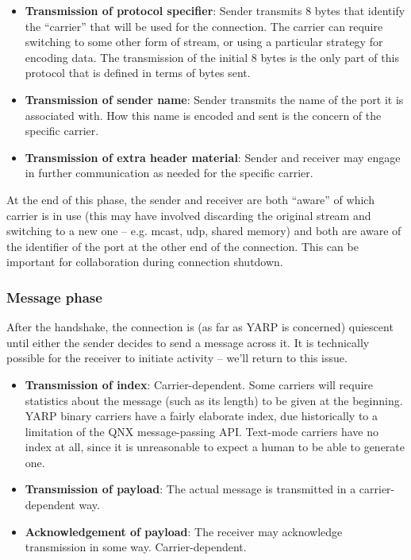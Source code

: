 \begin{itemize} \pflist

\item {\bf Transmission of protocol specifier}:
Sender transmits 8 bytes that identify the ``carrier'' that will be
used for the connection.  The carrier can require switching to 
some other form of stream, or using a particular strategy for
encoding data.  The transmission of the initial 8 bytes is the
only part of this protocol that is defined in terms of bytes sent.

\item {\bf Transmission of sender name}: Sender transmits the name of
the port it is associated with.  How this name is encoded and sent is
the concern of the specific carrier.

\item {\bf Transmission of extra header material}: Sender and
receiver may engage in further communication as needed for the
specific carrier.  

\end{itemize}

At the end of this phase, the sender and receiver are both ``aware''
of which carrier is in use (this may have involved discarding the
original stream and switching to a new one -- e.g. mcast, udp, shared
memory) and both are aware of the identifier of the port at the
other end of the connection.  This can be important for collaboration
during connection shutdown.


\subsubsection*{Message phase}

After the handshake, the connection is (as far as YARP is concerned)
quiescent until either the sender decides to send a message across it.
It is technically possible for the receiver to initiate activity --
we'll return to this issue.

\begin{itemize} \pflist

\item {\bf Transmission of index}: Carrier-dependent. Some carriers
will require statistics about the message (such as its length) to be
given at the beginning.  YARP binary carriers have a fairly elaborate
index, due historically to a limitation of the QNX message-passing
API.  Text-mode carriers have no index at all, since it is
unreasonable to expect a human to be able to generate one.

\item {\bf Transmission of payload}: The actual message is
transmitted in a carrier-dependent way.

\item {\bf Acknowledgement of payload}: The receiver may 
acknowledge transmission in some way.  Carrier-dependent.

\end{itemize}

